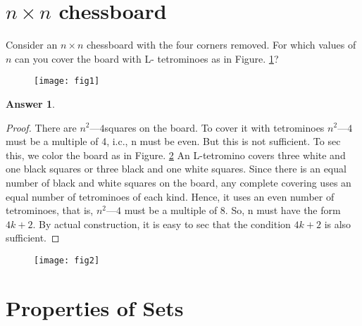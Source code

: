 \documentclass{article}
\renewcommand{\(}{\left(}
\renewcommand{\)}{\right)}
\theoremstyle{plain}
\theoremstyle{plain}
\theoremstyle{definition}
\newtheorem*{answer}{Answer}
\begin{document}
\section{$n \times n$ chessboard}
Consider an $ n \times n $ chessboard with the four corners removed. For which values of $n$ can you cover the board with L- tetrominoes as in Figure. \ref{fig1}?
\begin{figure}[h]
\texttt{[image: fig1]}
\caption{}
\label{fig1}
\end{figure}
\begin{shaded}
\begin{answer}
\begin{proof}
There are $ n^2 — 4 $squares on the board. To cover it with tetrominoes $ n^2 — 4 $ must be a multiple of 4, i.c., n must be even. But this is not sufficient. To sec this, we color the board as in Figure. \ref{fig2} An L-tetromino covers three white and one black squares or three black and one white squares. Since there is an equal number of black and white squares on the board, any complete covering uses an equal number of tetrominoes of each kind. Hence, it uses an even number of tetrominoes, that is, $n^2 — 4$ must be a multiple of 8. So, n must have the form $4k + 2$. By actual construction, it is easy to sec that the condition $4k + 2$ is also sufficient.
\end{proof}
\end{answer}
\end{shaded}
\begin{figure}[h]
\texttt{[image: fig2]}
\caption{}
\label{fig2}
\end{figure}

\section{Properties of Sets}
\end{document}
